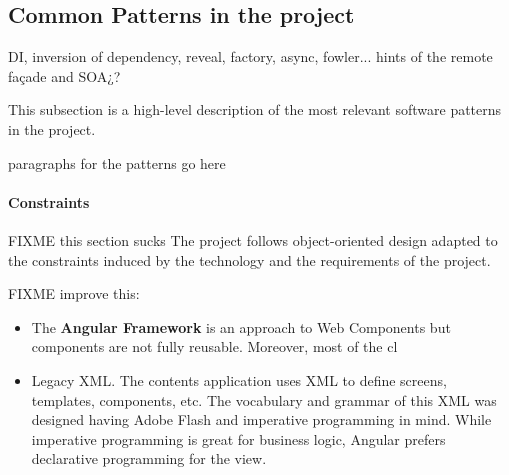 \subsection{Common Patterns in the project}
DI, inversion of dependency, reveal, factory, async, fowler... hints of the remote façade and SOA¿?

This subsection is a high-level description of the most relevant software patterns in the project.

paragraphs for the patterns go here

\paragraph{Constraints}
FIXME this section sucks
The project follows object-oriented design adapted to the constraints induced by the technology and the requirements of the project.

FIXME improve this:
\begin{itemize}
    \item The \textbf{Angular Framework} is an approach to Web Components but components are not fully reusable. Moreover, most of the cl
    \item  Legacy \ac{XML}. The contents application uses \ac{XML} to define screens, templates, components, etc. The vocabulary and grammar of this \ac{XML} was designed having Adobe Flash and imperative programming in mind. While imperative programming is great for business logic, Angular prefers declarative programming for the view. 
\end{itemize}

